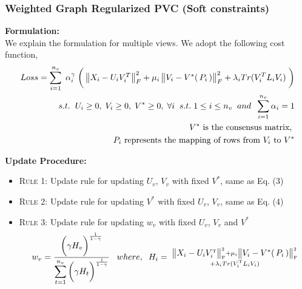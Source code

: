 \documentclass[a4paper]{article}
\begin{document}
	\subsubsection{Weighted Graph Regularized PVC (Soft constraints)}
	
	\textbf{Formulation:}\\
	We explain the formulation for multiple views. We adopt the following cost function,
	\begin{align*}
	Loss = \displaystyle\sum_{i=1}^{n_{v}} \; \alpha_{i}^{\gamma} \; 
		\bigg(\begin{Vmatrix} X_{i}-U_{i}V^{T}_{i} \end{Vmatrix}^{2}_{F}	
		+ \mu_{i}\begin{Vmatrix} V_{i}-V^{*}(\, P_{i} \, ) \end{Vmatrix}^{2}_{F}
		+ \lambda_{i}Tr(V^{T}_{i}L_{i}V_{i}) \; \bigg)\\	
		s.t. \hspace{2mm}  U_{i}\geq0,\;V_{i}\geq0,\;V^{*}\geq0,\;\forall i \;\;s.t.\; 1 \leq i \leq n_{v}
		\;\; and \;\; \sum_{i=1}^{n_{v}} \alpha_{i} = 1 \\
		V^{*} \text{ is the consensus matrix, } \\
		P_{i} \text{ represents the mapping of rows from } V_{i} \text{ to } V^{*}
	\end{align*}
	
	\noindent
	\textbf{Update Procedure:}
	\begin{itemize}
		\item \textsc{Rule 1:}	Update rule for updating $U_{v}$, ${V_{v}}$ with fixed $V^{*}$, same as Eq. (3)
		\item \textsc{Rule 2:}	Update rule for updating $V^{*}$ with fixed $U_{v}$, ${V_{v}}$, same as Eq. (4) 
		\item \textsc{Rule 3:}	Update rule for updating $w_{v}$ with fixed $U_{v}$, ${V_{v}}$ and $V^{*}$ 
			\begin{multline}
			w_{v} = \frac{ \bigg( \gamma H_{v} \bigg)^{\frac{1}{1-\gamma}}}
			{\displaystyle \sum_{t=1}^{n_{v}}
			\bigg( \gamma H_{t} \bigg)^{\frac{1}{1-\gamma}}} \;\;\;
			where, \;\; H_{i} = \; \substack { \begin{Vmatrix} X_{i}-U_{i}V^{\text{\tiny{T}}}_{i}
			 \end{Vmatrix}^{\text{\tiny{2}}}_{\text{\tiny{F}}} + \mu_{i}\begin{Vmatrix} V_{i}-V^{*}(\, P_{i} \, ) 
			 \end{Vmatrix}^{\text{\tiny{2}}}_{\text{\tiny{F}}} \\
			+ \lambda_{i}Tr(V^{\text{\tiny{T}}}_{i}L_{i}V_{i}) }\\
			\end{multline}
	\end{itemize}		
	
\end{document}
